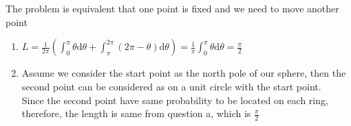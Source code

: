 \documentclass[10pt,a4paper]{article}
\begin{document}
\section{}    
    \noindent The problem is equivalent that one point is fixed and we need to move another point
    \begin{enumerate}[a]
        \item $L=\frac{1}{2\pi}(\int_0^\pi\theta\mathrm{d}\theta+\int_\pi^{2\pi}(2\pi-\theta)\mathrm{d}\theta)=\frac{1}{\pi}\int_0^\pi\theta\mathrm{d}\theta=\frac{\pi}{2}$
        \item Assume we consider the start point as the north pole of our sphere, then the second point can be considered as on a unit circle with the start point.
        \\Since the second point have same probability to be located on each ring, therefore, the length is same from question a, which is $\frac{\pi}{2}$
    \end{enumerate}
\end{document}
